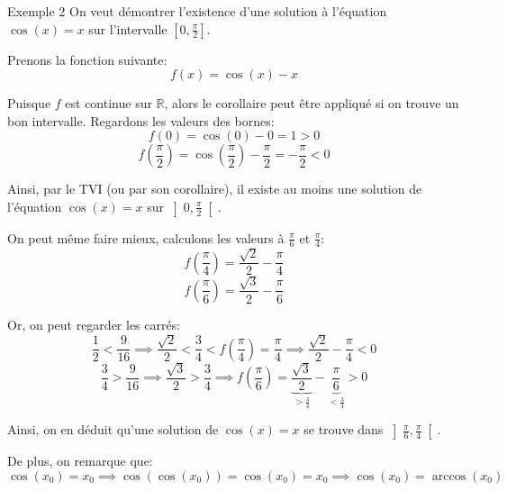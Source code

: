 \documentclass[a4paper]{article}
\begin{document}
\begin{parag}{Exemple 2}
    On veut démontrer l'existence d'une solution à l'équation $\cos\left(x\right) = x$ sur l'intervalle $\left[0, \frac{\pi}{2}\right]$. 

    Prenons la fonction suivante: 
    \[f\left(x\right) = \cos\left(x\right) - x\]
    
    Puisque $f$ est continue sur $\mathbb{R}$, alors le corollaire peut être appliqué si on trouve un bon intervalle. Regardons les valeurs des bornes: 
    \[f\left(0\right) = \cos\left(0\right) - 0 = 1 > 0\]
    \[f\left(\frac{\pi}{2}\right) = \cos\left(\frac{\pi}{2}\right) - \frac{\pi}{2} = -\frac{\pi}{2} < 0\]

    Ainsi, par le TVI (ou par son corollaire), il existe au moins une solution de l'équation $\cos\left(x\right) = x$ sur $\left]0, \frac{\pi}{2}\right[ $.

    On peut même faire mieux, calculons les valeurs à $\frac{\pi}{6}$ et $\frac{\pi}{4}$: 
    \[f\left(\frac{\pi}{4}\right) = \frac{\sqrt{2}}{2} - \frac{\pi}{4}\]
    \[f\left(\frac{\pi}{6}\right) = \frac{\sqrt{3}}{2} - \frac{\pi}{6}\]

    Or, on peut regarder les carrés: 
    \[\frac{1}{2} < \frac{9}{16} \implies \frac{\sqrt{2}}{2} < \frac{3}{4} < f\left(\frac{\pi}{4}\right) = \frac{\pi}{4} \implies \frac{\sqrt{2}}{2} - \frac{\pi}{4} < 0\]
    \[\frac{3}{4} > \frac{9}{16} \implies \frac{\sqrt{3}}{2} > \frac{3}{4} \implies f\left(\frac{\pi}{6}\right) = \underbrace{\frac{\sqrt{3}}{2}}_{> \frac{3}{4}} - \underbrace{\frac{\pi}{6}}_{< \frac{3}{4}} > 0\]
    
    Ainsi, on en déduit qu'une solution de $\cos\left(x\right) = x$ se trouve dans $\left]\frac{\pi}{6}, \frac{\pi}{4}\right[ $.

    De plus, on remarque que: 
    \[\cos\left(x_0\right) = x_0 \implies \cos\left(\cos\left(x_0\right)\right) = \cos\left(x_0\right) = x_0 \implies \cos\left(x_0\right) = \arccos\left(x_0\right)\]

\end{parag}
\end{document}

